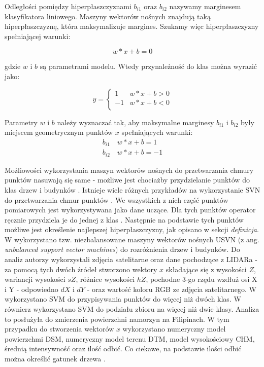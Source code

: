 Odległości pomiędzy hiperpłaszczyznami $b_{i1}$ oraz $b_{i2}$ nazywamy marginesem klasyfikatora liniowego. Maszyny wektorów nośnych znajdują taką hiperpłaszczyznę, która maksymalizuje margines. Szukamy więc hiperpłaszczyzny spełniającej warunki:

\begin{equation}
    w*x + b =0
\end{equation}

gdzie $w$ i $b$ są parametrami modelu. Wtedy przynależność do klas można wyrazić jako:

\begin{displaymath}
    y = \left\{ \begin{array}{ll}
        1 & \textrm{$w*x+b>0$}\\
        -1 & \textrm{$w*x+b<0$}\\
    \end{array} \right.
\end{displaymath}

Parametry $w$ i $b$ należy wyznaczać tak, aby maksymalne marginesy $b_{i1}$ i $b_{i2}$ były miejscem geometrycznym punktów $x$ spełniających warunki:
\begin{eqnarray}
    b_{i1} \quad w*x + b =1 \\
    b_{i2} \quad w*x + b =-1
\end{eqnarray}

Możliowości wykorzystania maszyn wektorów nośnych do przetwarzania chmury punktów nasuwają się same - możliwe jest chociażby przydzielanie punktów do klas drzew i budynków \cite{xwang2011}. Istnieje wiele 
różnych przykładów na wykorzystanie SVN do przetwarzania chmur punktów \cite{xwang2011,li2013,david2015}. We wszystkich z nich część punktów pomiarowych jest wykorzystywana jako dane uczące.
Dla tych punktów operator ręcznie przydziela je do jednej z klas \cite{xwang2011}. Następnie na podstawie tych punktów możliwe jest określenie najlepszej hiperpłaszczyzny, jak opisano w sekcji \textit{definicja}.
W \cite{xwang2011} wykorzystano tzw. niezbalansowane maszyny wektorów nośnych USVN (z ang. \textit{unbalanced support vector machines}) do rozróżnienia drzew i budynków.
Do analiz autorzy wykorzystali zdjęcia satelitarne oraz dane pochodzące z LIDARa - za pomocą tych dwóch źródeł stworzono wektory $x$
składające się z wysokości $Z$, wariancji wysokości $sZ$, różnice wysokości $hZ$,
pochodne 3-go rzędu wzdłuż osi X i Y - odpowiedno $dX$ i $dY$ - oraz wartość koloru RGB ze zdjęcia satelitarnego. 
W \cite{li2013} wykorzystano SVM do przypisywania punktów do więcej niż dwóch klas. 
W \cite{david2015} równierz wykorzystano SVM do podziału zbioru na więcej niż dwie klasy. Analiza to posłużyła do zmierzenia powierzchni namorzyn na Filipinach. 
W tym przypadku do stworzenia wektorów $x$ wykorzystano numeryczny model powierzchmi DSM, numeryczny model terenu DTM, model wysokościowy CHM, średnią intensywność oraz ilość odbić. Co ciekawe, na podstawie
ilości odbić można określić gatunek drzewa \cite{Sasaki2012}.

